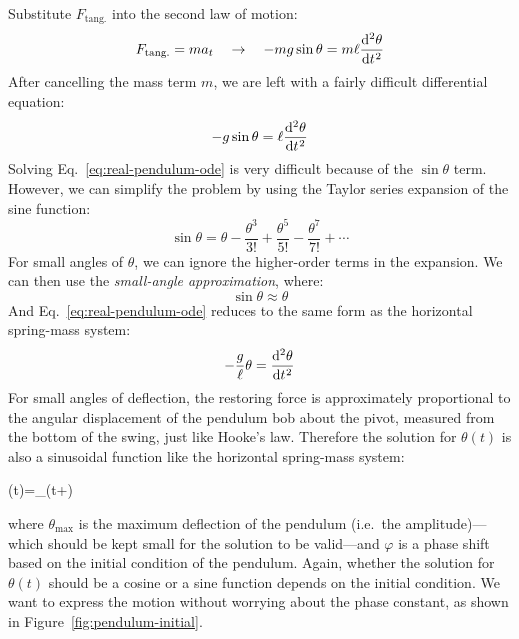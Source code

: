 Substitute $F_\text{tang.}$ into the second law of motion:
\begin{equation*}
  F_\text{tang.}=ma_t\quad\rightarrow\quad
  -mg\sin\theta=m\ell\diff[2]{\theta}t
\end{equation*}
After cancelling the mass term $m$, we are left with a fairly difficult
differential equation:
\begin{equation}
  -g\sin\theta=\ell\diff[2]{\theta}t
  \label{eq:real-pendulum-ode}
\end{equation}
Solving Eq.~\ref{eq:real-pendulum-ode} is very difficult because of the
$\sin\theta$ term. However, we can simplify the problem by using the Taylor
series expansion of the sine function:
\begin{equation*}
  \sin\theta
  =\theta-\frac{\theta^3}{3!}+\frac{\theta^5}{5!}-\frac{\theta^7}{7!}+\cdots
\end{equation*}
For small angles of $\theta$, we can ignore the higher-order terms in the
expansion. We can then use the \emph{small-angle approximation}, where:
\begin{equation*}
  \sin\theta\approx\theta
\end{equation*}
And Eq.~\ref{eq:real-pendulum-ode} reduces to the same form as the horizontal
spring-mass system: %
\begin{equation}
  -\frac g\ell\theta = \diff[2]{\theta}t
\end{equation}
For small angles of deflection, the restoring force is approximately
proportional to the angular displacement of the pendulum bob about the pivot,
measured from the bottom of the swing, just like Hooke's law. Therefore the
solution for $\theta(t)$ is also a sinusoidal function like the horizontal
spring-mass system:
\begin{important-equation}
  \theta(t)=\theta_\cos(\omega t+\varphi)
  \quad\quad{}
\end{important-equation}
where $\theta_\text{max}$ is the maximum deflection of the pendulum (i.e.\ the
amplitude)---which should be kept small for the solution to be
valid---and $\varphi$ is a phase shift based on the initial condition of the
pendulum. Again, whether the solution for $\theta(t)$ should be a cosine or a
sine function depends on the initial condition. We want to express the motion
without worrying about the phase constant, as shown in
Figure~\ref{fig:pendulum-initial}.
